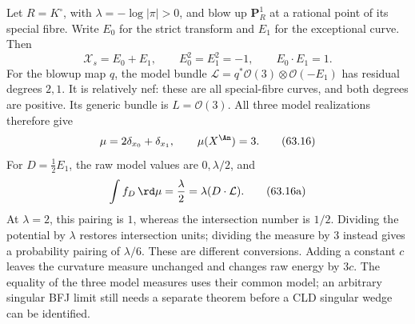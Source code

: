 \noindent\begin{minipage}{\linewidth}
\begin{example}
\label{ex:dict-two-component}
Let $R=K^\circ$, with $\lambda=-\log|\pi|>0$, and blow up
$\mathbf P^1_R$ at a rational point of its special fibre. Write
$E_0$ for the strict transform and $E_1$ for the exceptional curve.
Then
\[
 \mathcal X_s=E_0+E_1,\qquad
 E_0^2=E_1^2=-1,\qquad E_0\cdot E_1=1.
\]
For the blowup map $q$, the model bundle
$\mathcal L=q^*\mathcal O(3)\otimes\mathcal O(-E_1)$
has residual degrees $2,1$. It is relatively nef: these are all
special-fibre curves, and both degrees are positive. Its generic bundle
is $L=\mathcal O(3)$. All three model realizations therefore give
\[
                     \mu=2\delta_{x_0}+\delta_{x_1},
                     \qquad \mu(X^{\An})=3.
\tag{63.16}\label{eq:dict-two-component-measure}
\]
For $D=\frac12E_1$, the raw model values are $0,\lambda/2$, and
\[
 \int f_D\,\rd\mu=\frac{\lambda}{2}
       =\lambda(D\cdot\mathcal L).
\tag{63.16a}\label{eq:dict-curve-valuation-unit}
\]
At $\lambda=2$, this pairing is $1$, whereas the intersection
number is $1/2$. Dividing the potential by $\lambda$ restores
intersection units; dividing the measure by $3$ instead gives
a probability pairing of $\lambda/6$. These are different conversions.
Adding a constant $c$ leaves the curvature measure unchanged and
changes raw energy by $3c$. The equality of the three model measures
uses their common model; an arbitrary singular BFJ limit still needs
a separate theorem before a CLD singular wedge can be identified.
\end{example}
\end{minipage}

